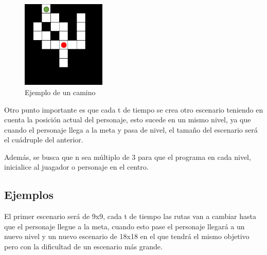\documentclass{article}
\begin{document}
\begin{figure}[h]
\includegraphics[width=4cm]{figura2.png}
\centering
\caption{Ejemplo de un camino}
\label{fig:figura2}
\end{figure}


Otro punto importante es que cada t de tiempo se crea otro escenario teniendo en cuenta la posición actual del personaje, esto sucede en un mismo nivel, ya que cuando el personaje llega a la meta y pasa de nivel, el tamaño del escenario será el cuádruple del anterior. 

Además, se busca que n sea múltiplo de 3 para que el programa en cada nivel, inicialice al juagador o personaje en el centro.

\newpage

\subsection{Ejemplos}
El primer escenario será de 9x9, cada t de tiempo las rutas van a cambiar hasta que el personaje llegue a la meta, cuando esto pase el personaje llegará a un nuevo nivel y un nuevo escenario de 18x18 en el que tendrá el mismo objetivo pero con la dificultad de un escenario más grande.
\end{document}
